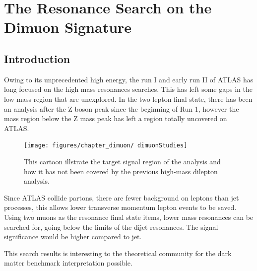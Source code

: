 \chapter{The Resonance Search on the Dimuon Signature}
\label{chapter:dimuon}


\section{Introduction}

    Owing to its unprecedented high energy, the run I and early run II of ATLAS has long focused on the high mass resonances searches. This has left some gaps in the low mass region that are unexplored. In the two lepton final state, there has been an analysis after the Z boson peak since the beginning of Run 1, however the mass region below the Z mass peak has left a region totally uncovered on ATLAS.

\begin{figure}[!htb]
    \begin{center}
        \texttt{[image: figures/chapter\_dimuon/
        dimuonStudies]}        
        \caption{
        This cartoon illstrate the target signal region of the analysis and how it has not been covered by the previous high-mass dilepton analysis. }
            \label{fig:dimuonstudies}
    \end{center}
\end{figure}
   
    Since ATLAS collide partons, there are fewer background on leptons than jet processes, this allows lower transverse momentum lepton events to be saved. Using two muons as the resonance final state items, lower mass resonances can be searched for, going below the limits of the dijet resonances. The signal significance would be higher compared to jet. 

    This search results is interesting to the theoretical community for the dark matter benchmark interpretation possible.

%
%    


